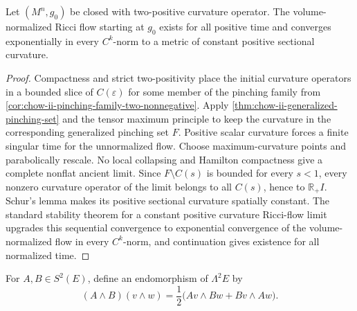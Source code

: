 \begin{theorem}
  \label{thm:chow-ii-boehm-wilking-convergence}
  Let \((M^n,g_0)\) be closed with two-positive curvature operator.  The
  volume-normalized Ricci flow starting at \(g_0\) exists for all positive
  time and converges exponentially in every \(C^k\)-norm to a metric of
  constant positive sectional curvature.
\end{theorem}
\begin{proof}
\sketch
  Compactness and strict two-positivity place the initial curvature operators
  in a bounded slice of \(C(\varepsilon)\) for some member of the pinching
  family from \ref{cor:chow-ii-pinching-family-two-nonnegative}.  Apply
  \ref{thm:chow-ii-generalized-pinching-set} and the tensor maximum principle
  to keep the curvature in the corresponding generalized pinching set \(F\).
  Positive scalar curvature forces a finite singular time for the unnormalized
  flow.  Choose maximum-curvature points and parabolically rescale.  No local
  collapsing and Hamilton compactness give a complete nonflat ancient limit.
  Since \(F\setminus C(s)\) is bounded for every \(s<1\), every nonzero
  curvature operator of the limit belongs to all \(C(s)\), hence to
  \(\mathbb R_+I\).  Schur's lemma makes its positive sectional curvature
  spatially constant.  The standard stability theorem for a constant positive
  curvature Ricci-flow limit upgrades this sequential convergence to
  exponential convergence of the volume-normalized flow in every
  \(C^k\)-norm, and continuation gives existence for all normalized time.
\end{proof}

\begin{definition}
  \label{def:chow-ii-symmetric-endomorphism-wedge}
  For \(A,B\in S^2(E)\), define an endomorphism of \(\Lambda^2E\) by
  \[
    (A\wedge B)(v\wedge w)
      =\frac12\bigl(Av\wedge Bw+Bv\wedge Aw\bigr).
  \]
\end{definition}

